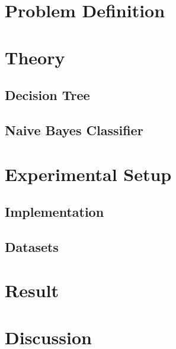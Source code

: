 \documentclass[12pt]{article}
\begin{document}
\maketitle
\thispagestyle{empty}
\clearpage
\newpage

\section{Problem Definition}



\section{Theory}
\subsection{Decision Tree}

\subsection{Naive Bayes Classifier}


\section{Experimental Setup}
\subsection{Implementation}


\subsection{Datasets}



\section{Result}


\section{Discussion}
  
\end{document}
